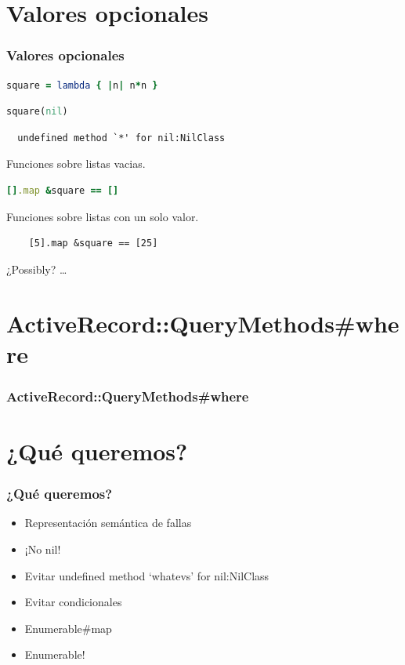\documentclass{beamer}
\begin{document}
\section{Valores opcionales}
\begin{frame}[fragile]
  \frametitle{Valores opcionales}

  \begin{lstlisting}[language=Ruby]
    square = lambda { |n| n*n }
  \end{lstlisting}
  \begin{lstlisting}[language=Ruby]
    square(nil)
  \end{lstlisting}

  \begin{verbatim}
  undefined method `*' for nil:NilClass
  \end{verbatim}

  Funciones sobre listas vacias.
  \begin{lstlisting}[language=Ruby]
    [].map &square == []
  \end{lstlisting}
  Funciones sobre listas con un solo valor.
  \begin{lstlisting}
    [5].map &square == [25]
  \end{lstlisting}
  ¿Possibly? \ldots
\end{frame}

\section{ActiveRecord::QueryMethods\#where}
\begin{frame}[fragile]
  \frametitle{ActiveRecord::QueryMethods\#where}
  
\end{frame}

\section{¿Qué queremos?}
\begin{frame}
  \frametitle{¿Qué queremos?}
  \begin{itemize}
    \item Representación semántica de fallas
    \pause
    \item ¡No nil!
    \pause
    \item Evitar undefined method `whatevs' for nil:NilClass
    \pause
    \item Evitar condicionales
    \pause
    \item Enumerable\#map
    \pause
    \item Enumerable!
  \end{itemize}
\end{frame}
\end{document}
